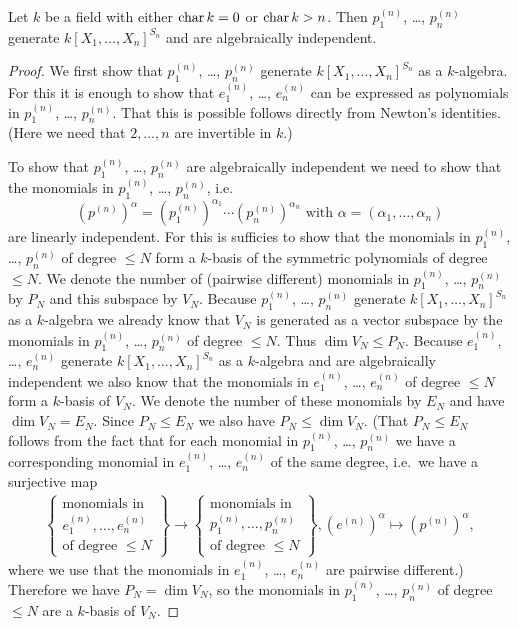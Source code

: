 \begin{thrm}
 Let $k$ be a field with either $\operatorname{char} k = 0$ or $\operatorname{char} k > n$. Then $p^{(n)}_1$, \dots, $p^{(n)}_n$ generate $k[X_1, \dotsc, X_n]^{S_n}$ and are algebraically independent.
\end{thrm}
\begin{proof}
 We first show that $p^{(n)}_1$, \dots, $p^{(n)}_n$ generate $k[X_1, \dotsc, X_n]^{S_n}$ as a $k$-algebra. For this it is enough to show that $e^{(n)}_1$, \dots, $e^{(n)}_n$ can be expressed as polynomials in $p^{(n)}_1$, \dots, $p^{(n)}_n$. That this is possible follows directly from Newton’s identities. (Here we need that $2, \dotsc, n$ are invertible in $k$.)
 
 To show that $p^{(n)}_1$, \dots, $p^{(n)}_n$ are algebraically independent we need to show that the monomials in $p^{(n)}_1$, \dots, $p^{(n)}_n$, i.e.
 \[
  \left(p^{(n)}\right)^\alpha = \left(p^{(n)}_1\right)^{\alpha_1} \dotsm \left(p^{(n)}_n\right)^{\alpha_n} \text{ with } \alpha = (\alpha_1, \dotsc, \alpha_n)
 \]
 are linearly independent. For this is sufficies to show that the monomials in $p^{(n)}_1$, \dots, $p^{(n)}_n$ of degree $\leq N$ form a $k$-basis of the symmetric polynomials of degree $\leq N$. We denote the number of (pairwise different) monomials in $p^{(n)}_1$, \dots, $p^{(n)}_n$ by $P_N$ and this subspace by $V_N$. Because $p^{(n)}_1$, \dots, $p^{(n)}_n$ generate $k[X_1, \dotsc, X_n]^{S_n}$ as a $k$-algebra we already know that $V_N$ is generated as a vector subspace by the monomials in $p^{(n)}_1$, \dots, $p^{(n)}_n$ of degree $\leq N$. Thus $\dim V_N \leq P_N$. Because $e^{(n)}_1$, \dots, $e^{(n)}_n$ generate $k[X_1, \dotsc, X_n]^{S_n}$ as a $k$-algebra and are algebraically independent we also know that the monomials in $e^{(n)}_1$, \dots, $e^{(n)}_n$ of degree $\leq N$ form a $k$-basis of $V_N$. We denote the number of these monomials by $E_N$ and have $\dim V_N = E_N$. Since $P_N \leq E_N$ we also have $P_N \leq \dim V_N$. (That $P_N \leq E_N$ follows from the fact that for each monomial in $p^{(n)}_1$, \dots, $p^{(n)}_n$ we have a corresponding monomial in $e^{(n)}_1$, \dots, $e^{(n)}_n$ of the same degree, i.e.\ we have a surjective map
\begin{align*}
    \left\{ \begin{array}{c} \text{monomials in} \\ e^{(n)}_1, \dotsc, e^{(n)}_n \\ \text{of degree $\leq N$} \end{array} \right\}
    \to
    \left\{ \begin{array}{c} \text{monomials in} \\ p^{(n)}_1, \dotsc, p^{(n)}_n \\ \text{of degree $\leq N$} \end{array} \right\},
    \left(e^{(n)}\right)^\alpha \mapsto \left(p^{(n)}\right)^\alpha,
\end{align*}
where we use that the monomials in $e^{(n)}_1$, \dots, $e^{(n)}_n$ are pairwise different.)
Therefore we have $P_N = \dim V_N$, so the monomials in $p^{(n)}_1$, \dots, $p^{(n)}_n$ of degree $\leq N$ are a $k$-basis of $V_N$.
\end{proof}


